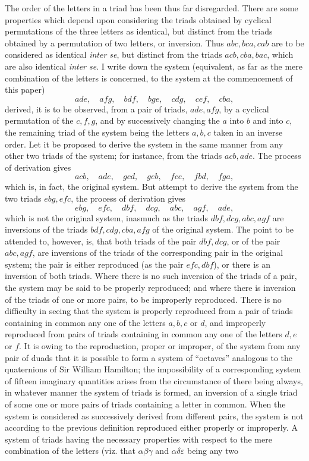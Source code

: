 \documentclass[11pt]{article}
\begin{document}
The order of the letters in a triad has been thus far disregarded. There are some
properties which depend upon considering the triads obtained by cyclical permutations
of the three letters as identical, but distinct from the triads obtained by a permutation
of two letters, or inversion. Thus $abc,bca,cab$ are to be considered as identical
\textit{inter se}, but distinct from the triads $acb,cba,bac$, which are also identical
\textit{inter se}. I write down the system (equivalent, as far as the mere combination
of the letters is concerned, to the system at the commencement of this paper)
\[
        ade,\quad afg,\quad bdf,\quad bge,\quad cdg,\quad cef,\quad cba,
\]
derived, it is to be observed, from a pair of triads, $ade,afg$, by a cyclical
permutation of the $c,f,g$, and by successively changing the $a$ into $b$ and into
$c$, the remaining triad of the system being the letters $a,b,c$ taken in an inverse
order. Let it be proposed to derive the system in the same manner from any other
two triads of the system; for instance, from the triads $acb,ade$. The process of
derivation gives
\[
        acb,\quad ade,\quad gcd,\quad geb,\quad fce,\quad fbd,\quad fga,\tag{1}
\]
which is, in fact, the original system. But attempt to derive the system from the
two triads $ebg,efc$, the process of derivation gives
\[
        ebg,\quad efc,\quad dbf,\quad dcg,\quad abc,\quad agf,\quad ade,
\]
which is not the original system, inasmuch as the triads $dbf,dcg,abc,agf$ are
inversions of the triads $bdf,cdg,cba,afg$ of the original system. The point to be
attended to, however, is, that both triads of the pair $dbf,dcg$, or of the pair
$abc,agf$, are inversions of the triads of the corresponding pair in the original
system; the pair is either reproduced (as the pair $efc,dbf$), or there is an inversion
of both triads. Where there is no such inversion of the triads of a pair, the system
may be said to be properly reproduced; and where there is inversion of the triads of
one or more pairs, to be improperly reproduced. There is no difficulty in seeing that
the system is properly reproduced from a pair of triads containing in common any one
of the letters $a,b,c$ or $d$, and improperly reproduced from pairs of triads containing
in common any one of the letters $d,e$ or $f$. It is owing to the reproduction, proper
or improper, of the system from any pair of duads that it is possible to form a system
of ``octaves'' analogous to the quaternions of Sir William Hamilton; the impossibility
of a corresponding system of fifteen imaginary quantities arises from the circumstance
of there being always, in whatever manner the system of triads is formed, an inversion
of a single triad of some one or more pairs of triads containing a letter in common.
When the system is considered as successively derived from different pairs, the system
is not according to the previous definition reproduced either properly or improperly.
A system of triads having the necessary properties with respect to the mere combination
of the letters (viz. that $\alpha\beta\gamma$ and $\alpha\delta\varepsilon$ being any two
\end{document}
